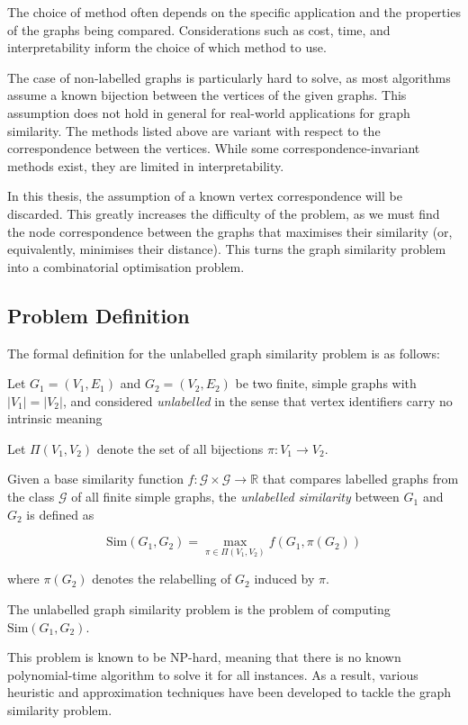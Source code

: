 The choice of method often depends on the specific application and the properties of the graphs being compared. Considerations such as cost, time, and interpretability inform the choice of which method to use.

The case of non-labelled graphs is particularly hard to solve, as most algorithms assume a known bijection between the vertices of the given graphs. This assumption does not hold in general for real-world applications for graph similarity. The methods listed above are variant with respect to the correspondence between the vertices. While some correspondence-invariant methods exist, they are limited in interpretability. 

In this thesis, the assumption of a known vertex correspondence will be discarded. This greatly increases the difficulty of the problem, as we must find the node correspondence between the graphs that maximises their similarity (or, equivalently, minimises their distance). This turns the graph similarity problem into a combinatorial optimisation problem.

\subsection{Problem Definition}
The formal definition for the unlabelled graph similarity problem is as follows:

Let $G_1=(V_1,E_1)$ and $G_2=(V_2,E_2)$ be two finite, simple graphs with $|V_1|=|V_2|$, and considered \textit{unlabelled} in the sense that vertex identifiers carry no intrinsic meaning

Let $\Pi(V_1,V_2)$ denote the set of all bijections $\pi: V_1 \to V_2$.

Given a base similarity function $f:\mathcal{G}\times\mathcal{G}\to \mathbb{R}$ that compares labelled graphs from the class $\mathcal{G}$ of all finite simple graphs, the \textit{unlabelled similarity} between $G_1$ and $G_2$ is defined as

$$\text{Sim}(G_1,G_2)= \max_{\pi\in\Pi(V_1,V_2)} f(G_1, \pi(G_2))$$

where $\pi(G_2)$ denotes the relabelling of $G_2$ induced by $\pi$.

The unlabelled graph similarity problem is the problem of computing $\text{Sim}(G_1,G_2)$.

This problem is known to be NP-hard, meaning that there is no known polynomial-time algorithm to solve it for all instances. As a result, various heuristic and approximation techniques have been developed to tackle the graph similarity problem.

